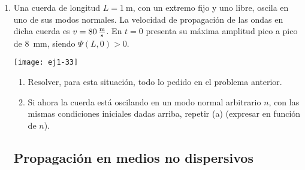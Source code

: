 \documentclass[11pt,spanish,a4paper]{article}
\begin{document}
\begin{enumerate}
\item 
\begin{minipage}[t][2.6cm]{0.6\textwidth}
Una cuerda de longitud $L = \SI{1}{\metre}$, con un extremo fijo y uno libre, oscila en uno de sus modos normales.
La velocidad de propagación de las ondas en dicha cuerda es \(v= \SI{80}{\metre\over\second}\).
En \(t = 0\) presenta su máxima amplitud pico a pico de \SI{8}{\milli\metre}, siendo $\Psi(L,0) > 0$.
\end{minipage}
\begin{minipage}[c][0.4cm][t]{0.34\textwidth}
	\texttt{[image: ej1-33]}
\end{minipage}
\begin{enumerate}
	\item Resolver, para esta situación, todo lo pedido en el problema anterior. 
	\item Si ahora la cuerda está oscilando en un modo normal arbitrario $n$, con las mismas condiciones iniciales dadas arriba, repetir (a) (expresar en función de $n$).
\end{enumerate}



\subsection*{Propagación en medios no dispersivos}


\end{enumerate}
\end{document}
